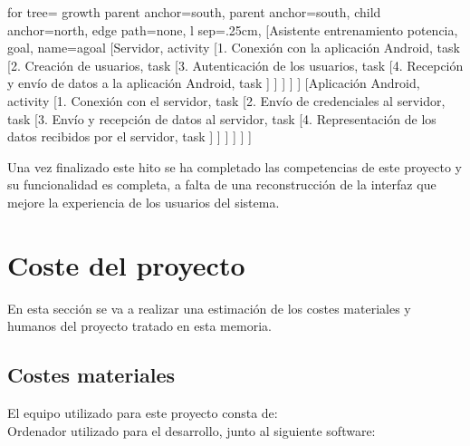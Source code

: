 \begin{adjustbox}{margin=3.5ex 6ex 3.5ex 3.5ex,center}

	\begin{forest} for tree={
	    growth parent anchor=south,
	    parent anchor=south,
	    child anchor=north,
	    edge path={none},
	    l sep=.25cm,
	}
	[Asistente entrenamiento potencia, goal, name=agoal
	    [Servidor, activity
	        [1. Conexión con la aplicación Android, task
	       	[2. Creación de usuarios, task
	        [3. Autenticación de los usuarios, task
	        [4. Recepción y envío de datos a la aplicación Android, task
	        ] ] ] ] ]
	    [Aplicación Android, activity
	        [1. Conexión con el servidor, task
			[2. Envío de credenciales al servidor, task
	        [3. Envío y recepción de datos al servidor, task
	        [4. Representación de los datos recibidos por el servidor, task
	        ] ] ] ] ] ]
	\end{forest}
\end{adjustbox}
\noindent
Una vez finalizado este hito se ha completado las competencias de este proyecto y su funcionalidad es completa, a falta de una reconstrucción de la interfaz que mejore la experiencia de los usuarios del sistema.

\section{Coste del proyecto}

En esta sección se va a realizar una estimación de los costes materiales y humanos del proyecto tratado en esta memoria.

\subsection*{Costes materiales}

El equipo utilizado para este proyecto consta de:
\\
Ordenador utilizado para el desarrollo, junto al siguiente software:

